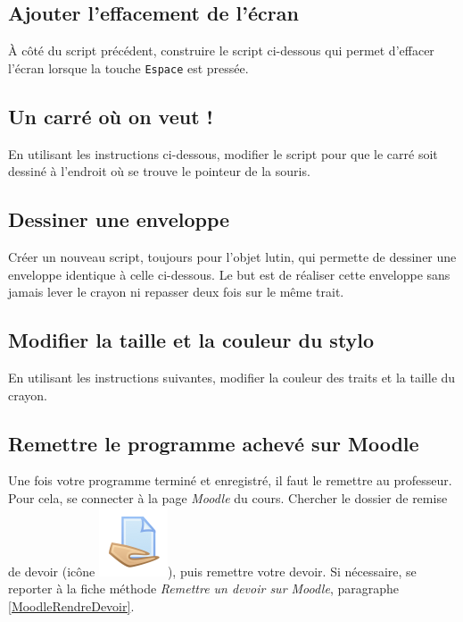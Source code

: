 \subsection{Ajouter l'effacement de l'écran}

À côté du script précédent, construire le script ci-dessous qui permet d'effacer l'écran lorsque la touche \texttt{Espace} est pressée.







\subsection{Un carré où on veut !}

En utilisant les instructions ci-dessous, modifier le script pour que le carré soit dessiné à l'endroit où se trouve le pointeur de la souris.



\subsection{Dessiner une enveloppe}

Créer un nouveau script, toujours pour l'objet lutin, qui permette de dessiner une enveloppe identique à celle ci-dessous. Le but est de réaliser cette enveloppe sans jamais lever le crayon ni repasser deux fois sur le même trait.





\subsection{Modifier la taille et la couleur du stylo}

En utilisant les instructions suivantes, modifier la couleur des traits et la taille du crayon.




\subsection{Remettre le programme achevé sur Moodle}

Une fois votre programme terminé et enregistré, il faut le remettre au professeur. Pour cela, se connecter à la page \emph{Moodle} du cours. Chercher le dossier de remise de devoir (icône \includegraphics[width=.04\textwidth]{./images/methode/MoodleDevoirIcone1}), puis remettre votre devoir. Si nécessaire, se reporter à la fiche méthode \emph{Remettre un devoir sur Moodle}, paragraphe \vref{MoodleRendreDevoir}.  




